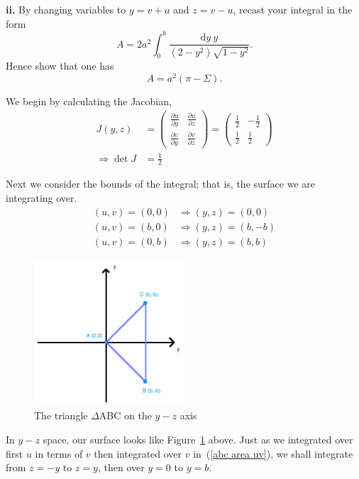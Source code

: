 \documentclass[a4paper]{article} %
\newcommand{\pmx}[1]{\begin{pmatrix}#1\end{pmatrix}}
\begin{document}
\pagebreak  %

\begin{framed}
\textbf{ii.} By changing variables to $y=v+u$ and $z=v-u$, recast your integral in the form
\begin{equation}
A=2a^2\int^b_0 \frac{\text{d}y~y}{(2-y^2)\sqrt{1-y^2}}.
\end{equation}
Hence show that one has
\begin{equation}
A=a^2(\pi-\Sigma).\label{A(pi,Sigma)}
\end{equation}
\end{framed}

We begin by calculating the Jacobian,
\begin{align}
J(y,z)&=\pmx{\frac{\partial u}{\partial y}&\frac{\partial u}{\partial z}\\
\frac{\partial v}{\partial y}&\frac{\partial v}{\partial z}}=\pmx{\frac{1}{2}&-\frac{1}{2}\\\frac{1}{2}&\frac{1}{2}}\\
\Rightarrow \det J&=\frac{1}{2}
\end{align}

Next we consider the bounds of the integral; that is, the surface we are integrating over.
\begin{align}
(u,v)=(0,0)&\Rightarrow (y,z)=(0,0)\\
(u,v)=(b,0)&\Rightarrow (y,z)=(b,-b)\\
(u,v)=(0,b)&\Rightarrow (y,z)=(b,b)
\end{align}

\begin{figure}[h]
\centering
\includegraphics[width=0.5\textwidth]{images/fii.png}
\caption{The triangle $\Delta$ABC on the $y-z$ axis}
\label{yz figure}
\end{figure}

In $y-z$ space, our surface looks like Figure~\ref{yz figure} above. Just as we integrated over first $u$ in terms of $v$ then integrated over $v$ in~(\ref{abc area uv}), we shall integrate from $z=-y$ to $z=y$, then over $y=0$ to $y=b$.
\end{document}
